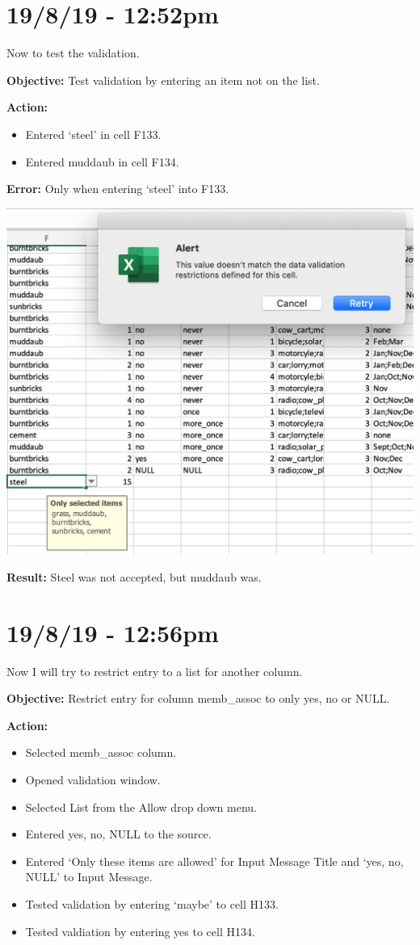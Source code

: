 \documentclass{article}
\begin{document}
\section*{19/8/19 - 12:52pm}

Now to test the validation.

\textbf{Objective:} Test validation by entering an item not on the list.

\textbf{Action:}
\begin{itemize}
    \item Entered ‘steel’ in cell F133.
    \item Entered muddaub in cell F134.
\end{itemize}

\textbf{Error:} Only when entering ‘steel’ into F133.

\includegraphics[width=\textwidth]{figf.png}

\textbf{Result:} Steel was not accepted, but muddaub was.

\section*{19/8/19 - 12:56pm}

Now I will try to restrict entry to a list for another column.

\textbf{Objective:} Restrict entry for column memb\_assoc to only yes, no or NULL.

\textbf{Action:}
\begin{itemize}
    \item Selected memb\_assoc column.
    \item Opened validation window.
    \item Selected List from the Allow drop down menu.
    \item Entered yes, no, NULL to the source.
    \item Entered ‘Only these items are allowed’ for Input Message Title and ‘yes, no, NULL’ to Input Message.
    \item Tested validation by entering ‘maybe’ to cell H133.
    \item Tested valdiation by entering yes to cell H134.
\end{itemize}
\end{document}
